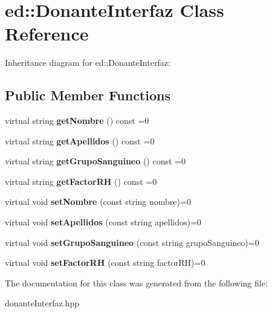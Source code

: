 \hypertarget{classed_1_1DonanteInterfaz}{}\section{ed\+:\+:Donante\+Interfaz Class Reference}
\label{classed_1_1DonanteInterfaz}


Inheritance diagram for ed\+:\+:Donante\+Interfaz\+:
\subsection*{Public Member Functions}
\begin{DoxyCompactItemize}
\item 
\hypertarget{classed_1_1DonanteInterfaz_a907becd8ffab6ea63c026bec0666fa03}{}virtual string {\bfseries get\+Nombre} () const =0\label{classed_1_1DonanteInterfaz_a907becd8ffab6ea63c026bec0666fa03}

\item 
\hypertarget{classed_1_1DonanteInterfaz_a80e995042e12c91d8e8b0629c352fa8e}{}virtual string {\bfseries get\+Apellidos} () const =0\label{classed_1_1DonanteInterfaz_a80e995042e12c91d8e8b0629c352fa8e}

\item 
\hypertarget{classed_1_1DonanteInterfaz_a06fe986962a85b487c8e1c5525beec15}{}virtual string {\bfseries get\+Grupo\+Sanguineo} () const =0\label{classed_1_1DonanteInterfaz_a06fe986962a85b487c8e1c5525beec15}

\item 
\hypertarget{classed_1_1DonanteInterfaz_ad6137e761b69b8fd085088a7a01cf5e2}{}virtual string {\bfseries get\+Factor\+R\+H} () const =0\label{classed_1_1DonanteInterfaz_ad6137e761b69b8fd085088a7a01cf5e2}

\item 
\hypertarget{classed_1_1DonanteInterfaz_a3b2724b918a259d4627504e50d871799}{}virtual void {\bfseries set\+Nombre} (const string nombre)=0\label{classed_1_1DonanteInterfaz_a3b2724b918a259d4627504e50d871799}

\item 
\hypertarget{classed_1_1DonanteInterfaz_a8e0fa810c7d82177033b19eccc18ef1f}{}virtual void {\bfseries set\+Apellidos} (const string apellidos)=0\label{classed_1_1DonanteInterfaz_a8e0fa810c7d82177033b19eccc18ef1f}

\item 
\hypertarget{classed_1_1DonanteInterfaz_a292420b68301f451cd841ef65ff8ee83}{}virtual void {\bfseries set\+Grupo\+Sanguineo} (const string grupo\+Sanguineo)=0\label{classed_1_1DonanteInterfaz_a292420b68301f451cd841ef65ff8ee83}

\item 
\hypertarget{classed_1_1DonanteInterfaz_a0a355302d67c18c35f901b7e543600c0}{}virtual void {\bfseries set\+Factor\+R\+H} (const string factor\+R\+H)=0\label{classed_1_1DonanteInterfaz_a0a355302d67c18c35f901b7e543600c0}

\end{DoxyCompactItemize}


The documentation for this class was generated from the following file\+:\begin{DoxyCompactItemize}
\item 
donante\+Interfaz.\+hpp\end{DoxyCompactItemize}
